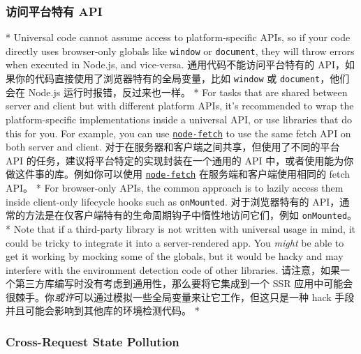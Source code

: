 \begin{paracol}{2}
\subsubsection{访问平台特有 API}
\switchcolumn[0]*%
Universal code cannot assume access to platform-specific APIs, so if
your code directly uses browser-only globals like \texttt{window} or
\texttt{document}, they will throw errors when executed in Node.js, and
vice-versa.
\switchcolumn
通用代码不能访问平台特有的
API，如果你的代码直接使用了浏览器特有的全局变量，比如 \texttt{window} 或
\texttt{document}，他们会在 Node.js 运行时报错，反过来也一样。
\switchcolumn[0]*%
For tasks that are shared between server and client but with different
platform APIs, it's recommended to wrap the platform-specific
implementations inside a universal API, or use libraries that do this
for you. For example, you can use
\href{https://github.com/node-fetch/node-fetch}{\texttt{node-fetch}} to
use the same fetch API on both server and client.
\switchcolumn
对于在服务器和客户端之间共享，但使用了不同的平台 API
的任务，建议将平台特定的实现封装在一个通用的 API
中，或者使用能为你做这件事的库。例如你可以使用
\href{https://github.com/node-fetch/node-fetch}{\texttt{node-fetch}}
在服务端和客户端使用相同的 fetch API。
\switchcolumn[0]*%
For browser-only APIs, the common approach is to lazily access them
inside client-only lifecycle hooks such as \texttt{onMounted}.
\switchcolumn
对于浏览器特有的
API，通常的方法是在仅客户端特有的生命周期钩子中惰性地访问它们，例如
\texttt{onMounted}。
\switchcolumn[0]*%
Note that if a third-party library is not written with universal usage
in mind, it could be tricky to integrate it into a server-rendered app.
You \emph{might} be able to get it working by mocking some of the
globals, but it would be hacky and may interfere with the environment
detection code of other libraries.
\switchcolumn
请注意，如果一个第三方库编写时没有考虑到通用性，那么要将它集成到一个 SSR
应用中可能会很棘手。你\emph{或许}可以通过模拟一些全局变量来让它工作，但这只是一种
hack 手段并且可能会影响到其他库的环境检测代码。
\switchcolumn[0]*%
\subsubsection{Cross-Request State Pollution}
\switchcolumn

\end{paracol}
